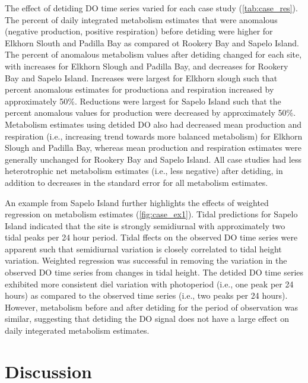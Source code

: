 \documentclass[letterpaper,12pt,oneside]{article}\usepackage[]{graphicx}\usepackage[]{color}
\begin{document}
The effect of detiding \ac{DO} time series varied for each case study (\cref{tab:case_res}).  The percent of daily integrated metabolism estimates that were anomalous (negative production, positive respiration) before detiding were higher for Elkhorn Slouth and Padilla Bay as compared ot Rookery Bay and Sapelo Island.  The percent of anomalous metabolism values after detiding changed for each site, with increases for Elkhorn Slough and Padilla  Bay, and decreases for Rookery Bay and Sapelo Island.  Increases were largest for Elkhorn slough such that percent anomalous estimates for productiona and respiration increased by approximately 50\%.  Reductions were largest for Sapelo Island such that the percent anomalous values for production were decreased by approximately 50\%.  Metabolism estimates using detided \ac{DO} also had decreased mean production and respiration (i.e., increasing trend towards more balanced metabolism) for Elkhorn Slough  and Padilla Bay, whereas mean production and respiration estimates were generally unchanged for Rookery Bay and Sapelo Island.  All case studies had less heterotrophic net metabolism estimates (i.e., less negative) after detiding, in addition to decreases in the standard error for all metabolism estimates.

An example from Sapelo Island further highlights the effects of weighted regression on metabolism estimates (\cref{fig:case_ex1}).  Tidal predictions for Sapelo Island indicated that the site is strongly semidiurnal with approximately two tidal peaks per 24 hour period.  Tidal ffects on the observed \ac{DO} time series were apparent such that semidiurnal variation is closely correlated to tidal height variation.  Weighted regression was successful in removing the variation in the observed \ac{DO} time series from changes in tidal height.  The detided \ac{DO} time series exhibited more consistent diel variation with photoperiod (i.e., one peak per 24 hours) as compared to the observed time series (i.e., two peaks per 24 hours).  However, metabolism before and after detiding for the period of observation was similar, suggesting that detiding the \ac{DO} signal does not have a large effect on daily integerated metabolism estimates.

\section{Discussion}
\end{document}
